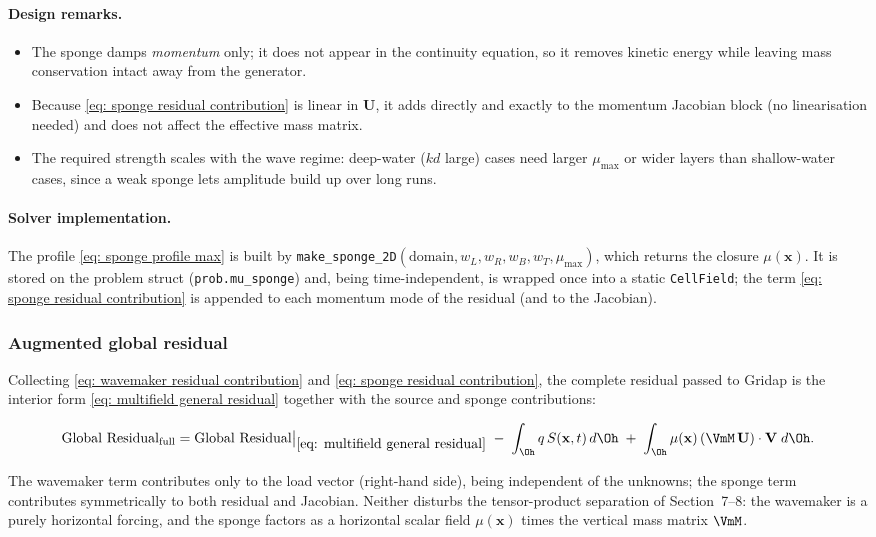 \paragraph{Design remarks.}
\begin{itemize}
    \item The sponge damps \emph{momentum} only; it does not appear in the continuity equation, so it
    removes kinetic energy while leaving mass conservation intact away from the generator.
    \item Because \eqref{eq: sponge residual contribution} is linear in $\mathbf{U}$, it adds directly
    and exactly to the momentum Jacobian block (no linearisation needed) and does not affect the
    effective mass matrix.
    \item The required strength scales with the wave regime: deep-water ($kd$ large) cases need larger
    $\mu_{\max}$ or wider layers than shallow-water cases, since a weak sponge lets amplitude build up
    over long runs.
\end{itemize}

\paragraph{Solver implementation.} The profile \eqref{eq: sponge profile max} is built by
\texttt{make\_sponge\_2D}$(\text{domain}, w_L, w_R, w_B, w_T, \mu_{\max})$, which returns the closure
$\mu(\mathbf{x})$. It is stored on the problem struct (\texttt{prob.mu\_sponge}) and, being
time-independent, is wrapped once into a static \texttt{CellField}; the term
\eqref{eq: sponge residual contribution} is appended to each momentum mode of the residual (and to the
Jacobian).

\subsubsection*{Augmented global residual}

Collecting \eqref{eq: wavemaker residual contribution} and
\eqref{eq: sponge residual contribution}, the complete residual passed to Gridap is the interior form
\eqref{eq: multifield general residual} together with the source and sponge contributions:
\begin{framed}
    \begin{multline}
        \text{Global Residual}_{\text{full}} = \text{Global Residual}\big|_{\eqref{eq: multifield general residual}}
        \;-\; \int_{\Oh} q\, S(\mathbf{x},t)\, d\Oh
        \;+\; \int_{\Oh} \mu(\mathbf{x})\left(\VmM\,\mathbf{U}\right)\cdot\mathbf{V}\; d\Oh .
        \label{eq: augmented global residual}
    \end{multline}
\end{framed}
The wavemaker term contributes only to the load vector (right-hand side), being independent of the
unknowns; the sponge term contributes symmetrically to both residual and Jacobian. Neither disturbs
the tensor-product separation of Section~7--8: the wavemaker is a purely horizontal forcing, and the
sponge factors as a horizontal scalar field $\mu(\mathbf{x})$ times the vertical mass matrix $\VmM$.
